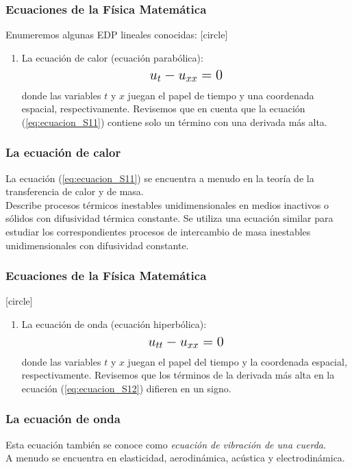 \documentclass[12pt]{beamer}
\begin{document}
\begin{frame}
\frametitle{Ecuaciones de la Física Matemática}
Enumeremos algunas EDP lineales conocidas:
\pause
{}
[circle]
\begin{enumerate}[<+->]
\item La ecuación de calor (ecuación parabólica):
\pause
\begin{align}
\text{\Large{$u_{t} - u_{xx} = 0$}}
\label{eq:ecuacion_S11}
\end{align}
donde las variables $t$ y $x$ juegan el papel de tiempo y una coordenada espacial, respectivamente. \pause Revisemos que en cuenta que la ecuación (\ref{eq:ecuacion_S11}) contiene solo un término con una derivada más alta.
\seti
\end{enumerate}
\end{frame}
\begin{frame}
\frametitle{La ecuación de calor}
La ecuación (\ref{eq:ecuacion_S11}) se encuentra a menudo en la teoría de la transferencia de calor y de masa.
\\
\bigskip
\pause
Describe procesos térmicos inestables unidimensionales en medios inactivos o sólidos con difusividad térmica constante. \pause Se utiliza una ecuación similar para estudiar los correspondientes procesos de intercambio de masa inestables unidimensionales con difusividad constante.
\end{frame}
\begin{frame}
\frametitle{Ecuaciones de la Física Matemática}
[circle]
\begin{enumerate}[<+->]
\conti
\item La ecuación de onda (ecuación hiperbólica):
\pause
\begin{align}
\text{\Large{$u_{tt} - u_{xx} = 0$}}
\label{eq:ecuacion_S12}
\end{align}
donde las variables $t$ y $x$ juegan el papel del tiempo y la coordenada espacial, respectivamente. \pause Revisemos que los términos de la derivada más alta en la ecuación (\ref{eq:ecuacion_S12}) difieren en un signo.
\seti
\end{enumerate}
\end{frame}
\begin{frame}
\frametitle{La ecuación de onda}
Esta ecuación también se conoce como \emph{ecuación de vibración de una cuerda}.
\\
\bigskip
\pause
A menudo se encuentra en elasticidad, aerodinámica, acústica y electrodinámica.
\end{frame}
\end{document}

